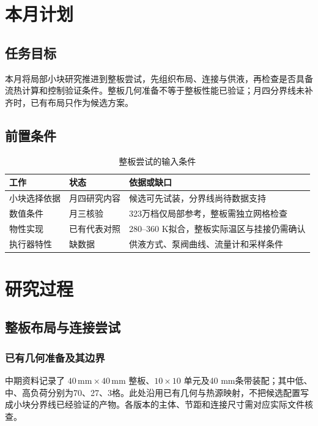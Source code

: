 \documentclass[stage2,fontset=fandol]{ydzjreport}
\begin{document}
\makestagetwohead

\section{本月计划}

\subsection{任务目标}

本月将局部小块研究推进到整板尝试，先组织布局、连接与供液，再检查是否具备流热计算和控制验证条件。整板几何准备不等于整板性能已验证；月四分界线未补齐时，已有布局只作为候选方案。

\subsection{前置条件}

\begin{table}[H]\centering
\caption{整板尝试的输入条件}\label{tab:pre}
\begin{tabularx}{\textwidth}{@{}Y Y Y@{}}
\toprule
{} 工作 & 状态 & 依据或缺口 \\
\midrule
小块选择依据 & 月四研究内容 & 候选可先试装，分界线尚待数据支持 \\
数值条件 & 月三核验 & 323万档仅局部参考，整板需独立网格检查 \\
物性实现 & 已有代表对照 & 280--360 K拟合，整板实际温区与挂接仍需确认 \\
执行器特性 & 缺数据 & 供液方式、泵阀曲线、流量计和采样条件 \\
\bottomrule\end{tabularx}\end{table}



\section{研究过程}

\subsection{整板布局与连接尝试}

\subsubsection{已有几何准备及其边界}
中期资料记录了 $40\,\mathrm{mm}\times40\,\mathrm{mm}$ 整板、$10\times10$ 单元及40 mm条带装配；其中低、中、高负荷分别为70、27、3格。此处沿用已有几何与热源映射，不把候选配置写成小块分界线已经验证的产物。各版本的主体、节距和连接尺寸需对应实际文件核查。
\end{document}
